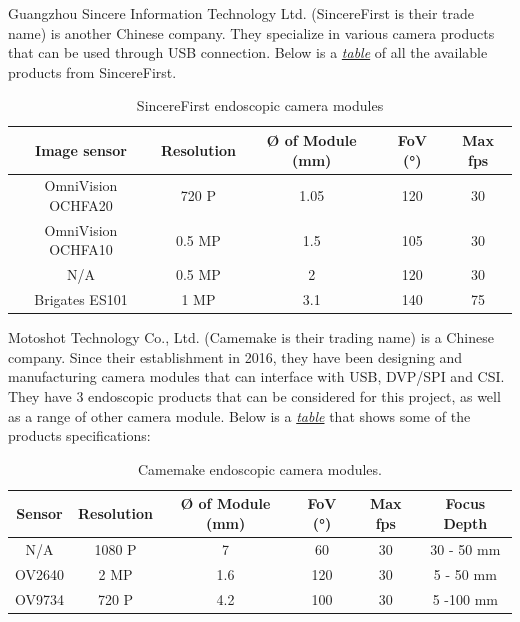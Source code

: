 \noindent Guangzhou Sincere Information Technology Ltd. (SincereFirst is their trade name) is another Chinese company. They specialize in various camera products that can be used through USB connection. \citep{SF-AU} Below is a \textit{\hyperref[tab:SincereFirst camera modules]{table}} of all the available products from SincereFirst.

\begin{table}[H]
    \centering
    \caption{SincereFirst endoscopic camera modules\citep{SF-CM}}
    \begin{tabular}{|c|c|c|c|c|}
        \hline
            Image sensor & Resolution & Ø of Module (mm) & FoV (°) & Max fps \\
        \hline
            OmniVision OCHFA20 & 720 P & 1.05 & 120 & 30 \\
        \hline
            OmniVision OCHFA10 & 0.5 MP & 1.5 & 105 & 30 \\
        \hline
            N/A & 0.5 MP & 2 & 120 & 30 \\
        \hline
            Brigates ES101 & 1 MP & 3.1 & 140 & 75 \\
        \hline
    \end{tabular}
    \label{tab:SincereFirst camera modules}
\end{table}


\noindent Motoshot Technology Co., Ltd. (Camemake is their trading name) is a Chinese company. Since their establishment in 2016, they have been designing and manufacturing camera modules that can interface with USB, DVP/SPI and CSI. They have 3 endoscopic products that can be considered for this project, as well as a range of other camera module.\citep{CM-HP} Below is a \textit{\hyperref[tab:Camemake camera modules]{table}} that shows some of the products specifications:

\begin{table}[H]
    \centering
    \caption{Camemake endoscopic camera modules. \citep{CM-ECM}}
    \begin{tabular}{|c|c|c|c|c|c|}
    \hline
        Sensor & Resolution & Ø of Module (mm) & FoV (°) & Max fps & Focus Depth\\
    \hline
        N/A & 1080 P & 7 & 60 & 30 & 30 - 50 mm \\
    \hline
        OV2640 & 2 MP & 1.6 & 120 & 30 & 5 - 50 mm \\
    \hline
        OV9734 & 720 P & 4.2 & 100 & 30 & 5 -100 mm \\
    \hline
        
    \end{tabular}
    \label{tab:Camemake camera modules}
\end{table}


